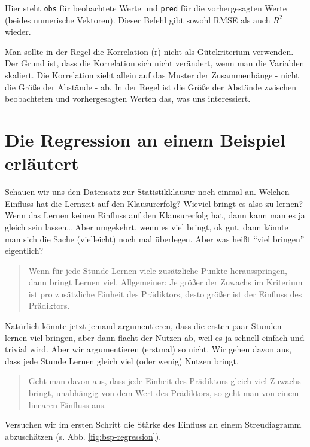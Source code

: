 \documentclass[12pt,ngerman,]{book}
\theoremstyle{definition}
\theoremstyle{definition}
\theoremstyle{remark}
\let\BeginKnitrBlock\begin \let\EndKnitrBlock\end
\begin{document}
Hier steht \texttt{obs} für beobachtete Werte und \texttt{pred} für die
vorhergesagten Werte (beides numerische Vektoren). Dieser Befehl gibt
sowohl RMSE als auch \(R^2\) wieder.

\BeginKnitrBlock{rmdcaution}
Man sollte in der Regel die Korrelation (r) nicht als Gütekriterium
verwenden. Der Grund ist, dass die Korrelation sich nicht verändert,
wenn man die Variablen skaliert. Die Korrelation zieht allein auf das
Muster der Zusammenhänge - nicht die Größe der Abstände - ab. In der
Regel ist die Größe der Abstände zwischen beobachteten und
vorhergesagten Werten das, was uns interessiert.
\EndKnitrBlock{rmdcaution}

\section{Die Regression an einem Beispiel
erläutert}\label{die-regression-an-einem-beispiel-erlautert}

Schauen wir uns den Datensatz zur Statistikklausur noch einmal an.
Welchen Einfluss hat die Lernzeit auf den Klausurerfolg? Wieviel bringt
es also zu lernen? Wenn das Lernen keinen Einfluss auf den Klausurerfolg
hat, dann kann man es ja gleich sein lassen\ldots{} Aber umgekehrt, wenn
es viel bringt, ok gut, dann könnte man sich die Sache (vielleicht) noch
mal überlegen. Aber was heißt ``viel bringen'' eigentlich?

\begin{quote}
Wenn für jede Stunde Lernen viele zusätzliche Punkte herausspringen,
dann bringt Lernen viel. Allgemeiner: Je größer der Zuwachs im Kriterium
ist pro zusätzliche Einheit des Prädiktors, desto größer ist der
Einfluss des Prädiktors.
\end{quote}

Natürlich könnte jetzt jemand argumentieren, dass die ersten paar
Stunden lernen viel bringen, aber dann flacht der Nutzen ab, weil es ja
schnell einfach und trivial wird. Aber wir argumentieren (erstmal) so
nicht. Wir gehen davon aus, dass jede Stunde Lernen gleich viel (oder
wenig) Nutzen bringt.

\begin{quote}
Geht man davon aus, dass jede Einheit des Prädiktors gleich viel Zuwachs
bringt, unabhängig von dem Wert des Prädiktors, so geht man von einem
linearen Einfluss aus.
\end{quote}

Versuchen wir im ersten Schritt die Stärke des Einfluss an einem
Streudiagramm abzuschätzen (s. Abb. \ref{fig:bsp-regression}).
\end{document}
